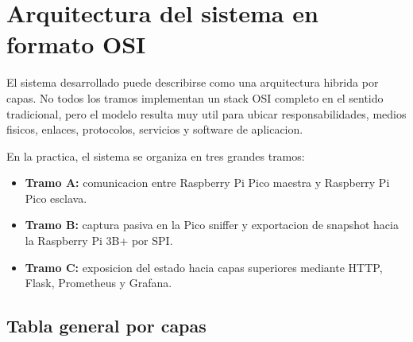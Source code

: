 \documentclass[12pt,a4paper]{article}
\begin{document}
\section*{Arquitectura del sistema en formato OSI}

El sistema desarrollado puede describirse como una arquitectura hibrida por capas. No todos los tramos implementan un stack OSI completo en el sentido tradicional, pero el modelo resulta muy util para ubicar responsabilidades, medios fisicos, enlaces, protocolos, servicios y software de aplicacion.

En la practica, el sistema se organiza en tres grandes tramos:

\begin{itemize}
    \item \textbf{Tramo A:} comunicacion entre Raspberry Pi Pico maestra y Raspberry Pi Pico esclava.
    \item \textbf{Tramo B:} captura pasiva en la Pico sniffer y exportacion de snapshot hacia la Raspberry Pi 3B+ por SPI.
    \item \textbf{Tramo C:} exposicion del estado hacia capas superiores mediante HTTP, Flask, Prometheus y Grafana.
\end{itemize}

\subsection*{Tabla general por capas}
\end{document}
